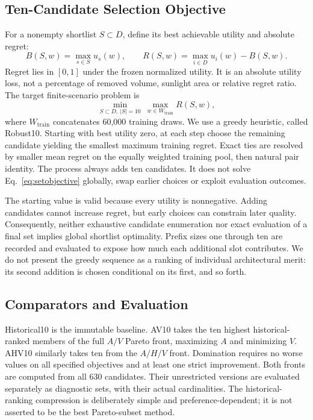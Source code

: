 \documentclass{llncs}
\begin{document}
\subsection{Ten-Candidate Selection Objective}
For a nonempty shortlist $S\subset D$, define its best achievable utility and absolute regret:
\begin{equation}
 B(S,w)=\max_{s\in S}u_s(w),\qquad R(S,w)=\max_{i\in D}u_i(w)-B(S,w).
\label{eq:regret}
\end{equation}
Regret lies in $[0,1]$ under the frozen normalized utility. It is an absolute utility loss, not a percentage of removed volume, sunlight area or relative regret ratio. The target finite-scenario problem is
\begin{equation}
 \min_{S\subset D,\ |S|=10}\ \max_{w\in W_{\mathrm{train}}}R(S,w),
\label{eq:setobjective}
\end{equation}
where $W_{\mathrm{train}}$ concatenates 60,000 training draws. We use a greedy heuristic, called Robust10. Starting with best utility zero, at each step choose the remaining candidate yielding the smallest maximum training regret. Exact ties are resolved by smaller mean regret on the equally weighted training pool, then natural pair identity. The process always adds ten candidates. It does not solve Eq.~\ref{eq:setobjective} globally, swap earlier choices or exploit evaluation outcomes.

The starting value is valid because every utility is nonnegative. Adding candidates cannot increase regret, but early choices can constrain later quality. Consequently, neither exhaustive candidate enumeration nor exact evaluation of a final set implies global shortlist optimality. Prefix sizes one through ten are recorded and evaluated to expose how much each additional slot contributes. We do not present the greedy sequence as a ranking of individual architectural merit: its second addition is chosen conditional on its first, and so forth.

\subsection{Comparators and Evaluation}
Historical10 is the immutable baseline. AV10 takes the ten highest historical-ranked members of the full $A/V$ Pareto front, maximizing $A$ and minimizing $V$. AHV10 similarly takes ten from the $A/H/V$ front. Domination requires no worse values on all specified objectives and at least one strict improvement. Both fronts are computed from all 630 candidates. Their unrestricted versions are evaluated separately as diagnostic sets, with their actual cardinalities. The historical-ranking compression is deliberately simple and preference-dependent; it is not asserted to be the best Pareto-subset method.
\end{document}

